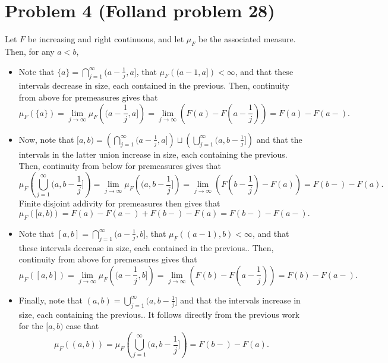 \documentclass{article}
\begin{document}
\section{Problem 4 (Folland problem 28)}
Let $F$ be increasing and right continuous, and let $\mu_F$ be the associated measure. Then, for any $a<b$, 
\begin{itemize}
	\item Note that $\{a\}=\bigcap_{j=1}^\infty\big(a-\frac{1}{j},a\big]$, that $\mu_F\left((a-1,a]\right)<\infty$, and that these intervals decrease in size, each contained in the previous. Then, continuity from above for premeasures gives that
	\[
	\mu_F(\{a\})=\lim_{j\to\infty}\mu_F\left(\bigg(a-\frac{1}{j},a\bigg]\right)=\lim_{j\to\infty}\left(F(a)-F\left(a-\frac{1}{j}\right)\right)=F(a)-F(a-).
	\]
	\item Now, note that $[a,b)=\left(\bigcap_{j=1}^\infty\big(a-\frac{1}{j},a\big]\right)\sqcup\left(\bigcup_{j=1}^\infty\big(a,b-\frac{1}{j}\big]\right)$ and that the intervals in the latter union increase in size, each containing the previous. Then, continuity from below for premeasures gives that 
	\[
	\mu_F\left(\bigcup_{j=1}^\infty\bigg(a,b-\frac{1}{j}\bigg]\right)=\lim_{j\to\infty}\mu_F\left(\bigg(a,b-\frac{1}{j}\bigg]\right)=\lim_{j\to\infty}\left(F\left(b-\frac{1}{j}\right)-F(a)\right)=F(b-)-F(a).
	\]
	Finite disjoint addivity for premeasures then gives that 
	\[
	\mu_F\left([a,b)\right)=F(a)-F(a-)+F(b-)-F(a)=F(b-)-F(a-).
	\]
	\item Note that $[a,b]=\bigcap_{j=1}^\infty\big(a-\frac{1}{j},b\big]$, that $\mu_F((a-1),b)<\infty$, and that these intervals decrease in size, each contained in the previous.. Then, continuity from above for premeasures gives that
	\[
	\mu_F([a,b])=\lim_{j\to\infty}\mu_F\left(\bigg(a-\frac{1}{j},b\bigg]\right)=\lim_{j\to\infty}\left(F(b)-F\left(a-\frac{1}{j}\right)\right)=F(b)-F(a-).
	\]
	\item Finally, note that $(a,b)=\bigcup_{j=1}^\infty\big(a,b-\frac{1}{j}\big]$ and that the intervals increase in size, each containing the previous.. It follows directly from the previous work for the $[a,b)$ case that 
	\[
	\mu_F((a,b))=\mu_F\left(\bigcup_{j=1}^\infty\bigg(a,b-\frac{1}{j}\bigg]\right)=F(b-)-F(a).
	\]
\end{itemize}
\end{document}
